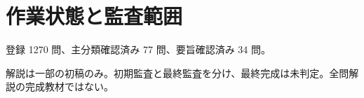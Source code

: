 \chapter{作業状態と監査範囲}
登録 1270 問、主分類確認済み 77 問、要旨確認済み 34 問。
\par 解説は一部の初稿のみ。初期監査と最終監査を分け、最終完成は未判定。全問解説の完成教材ではない。
